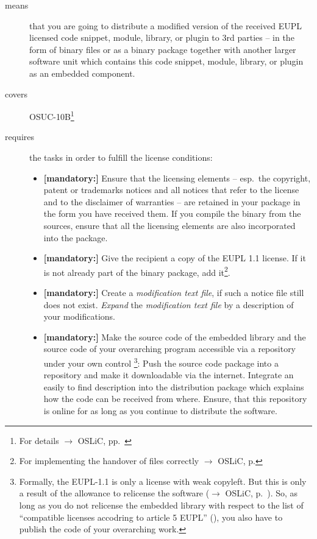 \begin{description}
\item[means] that you are going to distribute a modified version of the received
EUPL licensed code snippet, module, library, or plugin to 3rd parties -- in the
form of binary files or as a binary package together with another larger
software unit which contains this code snippet, module, library, or plugin as an
embedded component.
\item[covers] OSUC-10B\footnote{For details $\rightarrow$ OSLiC, pp.\
\pageref{OSUC-10B-DEF}}
\item[requires] the tasks in order to fulfill the license conditions:
\begin{itemize}
  
  
  \item \textbf{[mandatory:]} Ensure that the licensing elements -- esp.\ the
  copyright, patent or trademarks notices and all notices that refer to the
  license and to the disclaimer of warranties -- are retained in your package in
  the form you have received them. If you compile the binary from the sources,
  ensure that all the licensing elements are also incorporated into the package.
  
  \item \textbf{[mandatory:]} Give the recipient a copy of the EUPL 1.1
  license. If it is not already part of the binary package, add
  it\footnote{For implementing the handover of files correctly $\rightarrow$
  OSLiC, p. \pageref{DistributingFilesHint}}.
 
  \item \textbf{[mandatory:]} Create a \emph{modification text file}, if such a
  notice file still does not exist. \emph{Expand} the \emph{modification text
  file} by a description of your modifications.
  
  \item \textbf{[mandatory:]} Make the source code of the embedded library and
  the source code of your overarching program accessible via a repository under
  your own control \footnote{Formally, the EUPL-1.1 is only a license with weak
  copyleft. But this is only a result of the allowance to relicense the software
  ($\rightarrow$ OSLiC, p.\ \pageref{sec:ProtectingPowerOfEupl}). So, as long as
  you do not relicense the embedded library with respect to the list of
  \enquote{compatible licenses accodring to article 5 EUPL} (\cite[cf.][\nopage
  wp §5 and Appendix]{EuplLicense2007en}), you also have to publish the code of
  your overarching work.}: Push the source code package into a repository and
  make it downloadable via the internet. Integrate an easily to find description
  into the distribution package which explains how the code can be received from
  where. Ensure, that this repository is online for as long as you continue to
  distribute the software.
  

\end{itemize}
\end{description}
